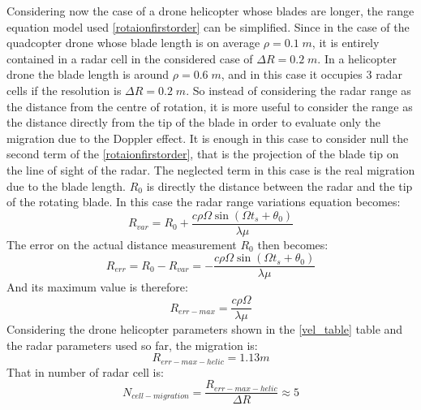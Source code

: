Considering now the case of a drone helicopter whose blades are longer, the range equation model used \ref{rotaionfirstorder} can be simplified. Since in the case of the quadcopter drone whose blade length is on average $\rho = 0.1\;m$, it is entirely contained in a radar cell in the considered case of $\Delta R = 0.2\;m$. In a helicopter drone the blade length is around $\rho = 0.6\;m$, and in this case it occupies $3$ radar cells if the resolution is $\Delta R = 0.2\;m$. So instead of considering the radar range as the distance from the centre of rotation, it is more useful to consider the range as the distance directly from the tip of the blade in order to evaluate only the migration due to the Doppler effect. It is enough in this case to consider null the second term of the \ref{rotaionfirstorder}, that is the projection of the blade tip on the line of sight of the radar. The neglected term in this case is the real migration due to the blade length. $R_0$ is directly the distance between the radar and the tip of the rotating blade. In this case the radar range variations equation becomes: 
\begin{equation}
    R_{var} = R_0 + \frac{c \rho \Omega \sin \left(\Omega t_{s}+\theta_{0}\right)}{\lambda \mu} 
    \label{rangevarhelicopter}
\end{equation} 
The error on the actual distance measurement $R_0$ then becomes:
\begin{equation}
    R_{err} = R_0 - R_{var} = -\frac{c \rho \Omega \sin \left(\Omega t_{s}+\theta_{0}\right)}{\lambda \mu}
\end{equation} 
And its maximum value is therefore:
\begin{equation}
R_{err-max} =  \frac{c \rho \Omega}{\lambda \mu}
\end{equation}
Considering the drone helicopter parameters shown in the \ref{vel_table} table and the radar parameters used so far, the migration is:
\begin{equation}
R_{err-max-helic} = 1.13 m
\end{equation}
That in number of radar cell is:
\begin{equation}
N_{cell-migration} = \frac{R_{err-max-helic}}{\Delta R} \approx 5 
\end{equation}

